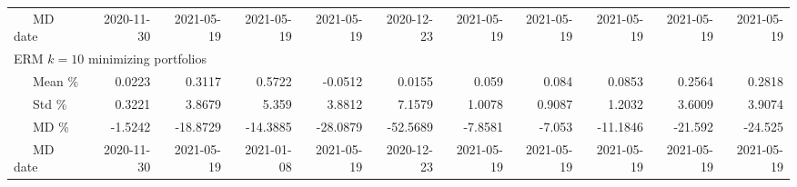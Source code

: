 \begin{table}[!]
{\begin{tabular}{l*{10}{r}}
\ \ \ MD date &  2020-11-30 &  2021-05-19 &  2021-05-19 &  2021-05-19 &  2020-12-23 &  2021-05-19 &  2021-05-19 &  2021-05-19 &  2021-05-19 &  2021-05-19 \\
  \multicolumn{10}{l}{ERM $k=10$ minimizing portfolios}   \\
\ \ \ Mean \%  &      0.0223 &      0.3117 &      0.5722 &     -0.0512 &      0.0155 &       0.059 &       0.084 &      0.0853 &      0.2564 &      0.2818 \\
\ \ \ Std \%   &      0.3221 &      3.8679 &       5.359 &      3.8812 &      7.1579 &      1.0078 &      0.9087 &      1.2032 &      3.6009 &      3.9074 \\
\ \ \ MD \%    &     -1.5242 &    -18.8729 &    -14.3885 &    -28.0879 &    -52.5689 &     -7.8581 &      -7.053 &    -11.1846 &     -21.592 &     -24.525 \\
\ \ \ MD date &  2020-11-30 &  2021-05-19 &  2021-01-08 &  2021-05-19 &  2020-12-23 &  2021-05-19 &  2021-05-19 &  2021-05-19 &  2021-05-19 &  2021-05-19 \\
\bottomrule
\end{tabular}}
\end{table}
